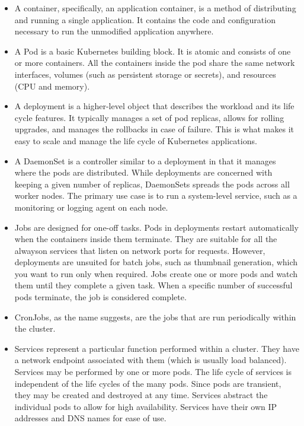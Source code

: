 \begin{itemize}
\item 
A container, specifically, an application container, is a method of distributing and running a single application. It contains the code and configuration necessary to run the unmodified application anywhere.

\item 
A Pod is a basic Kubernetes building block. It is atomic and consists of one or more containers. All the containers inside the pod share the same network interfaces, volumes (such as persistent storage or secrets), and resources (CPU and memory).

\item 
A deployment is a higher-level object that describes the workload and its life cycle features. It typically manages a set of pod replicas, allows for rolling upgrades, and manages the rollbacks in case of failure. This is what makes it easy to scale and manage the life cycle of Kubernetes applications.

\item 
A DaemonSet is a controller similar to a deployment in that it manages where the pods are distributed. While deployments are concerned with keeping a given number of replicas, DaemonSets spreads the pods across all worker nodes. The primary use case is to run a system-level service, such as a monitoring or logging agent on each node.

\item 
Jobs are designed for one-off tasks. Pods in deployments restart automatically when the containers inside them terminate. They are suitable for all the alwayson services that listen on network ports for requests. However, deployments are unsuited for batch jobs, such as thumbnail generation, which you want to run only when required. Jobs create one or more pods and watch them until they complete a given task. When a specific number of successful pods terminate, the job is considered complete.

\item 
CronJobs, as the name suggests, are the jobs that are run periodically within the cluster.

\item 
Services represent a particular function performed within a cluster. They have a network endpoint associated with them (which is usually load balanced). Services may be performed by one or more pods. The life cycle of services is independent of the life cycles of the many pods. Since pods are transient, they may be created and destroyed at any time. Services abstract the individual pods to allow for high availability. Services have their own IP addresses and DNS names for ease of use.
\end{itemize}

